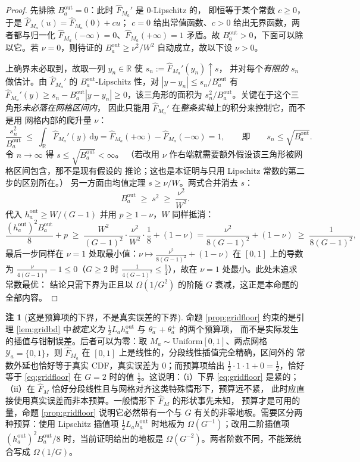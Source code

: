 \documentclass[a4paper,11pt]{article}
\theoremstyle{definition}
\newtheorem{remark}{注}
\newcommand{\R}{\mathbb R}
\newcommand{\1}{\mathbf 1}
\begin{document}
\begin{proof}
先排除 $B_a^{\mathrm{out}}=0$：此时 $\widehat F_{M_a}'$ 是 $0$-Lipschitz 的，
即恒等于某个常数 $c\ge0$，于是 $\widehat F_{M_a}(u)=\widehat F_{M_a}(0)+cu$；
$c=0$ 给出常值函数、$c>0$ 给出无界函数，两者都与归一化
$\widehat F_{M_a}(-\infty)=0$、$\widehat F_{M_a}(+\infty)=1$ 矛盾。故
$B_a^{\mathrm{out}}>0$，下面可以除以它。若 $\nu=0$，则待证的
$B_a^{\mathrm{out}}\ge\nu^2/W^2$ 自动成立，故以下设 $\nu>0$。

上确界未必取到，故取一列 $y_n\in\R$ 使 $s_n:=\widehat F_{M_a}'(y_n)\uparrow s$，
并对每个\emph{有限的} $s_n$ 做估计。由 $\widehat F_{M_a}'$ 的
$B_a^{\mathrm{out}}$-Lipschitz 性，对
$|y-y_n|\le s_n/B_a^{\mathrm{out}}$ 有
$\widehat F_{M_a}'(y)\ge s_n-B_a^{\mathrm{out}}|y-y_n|\ge 0$，该三角形的面积为
$s_n^2/B_a^{\mathrm{out}}$。关键在于这个三角形\emph{未必落在网格区间内}，
因此只能用 $\widehat F_{M_a}'$ 在\emph{整条实轴}上的积分来控制它，而不是用
网格内部的爬升量 $\nu$：
\[
\frac{s_n^2}{B_a^{\mathrm{out}}}
\;\le\;
\int_{\R}\widehat F_{M_a}'(y)\,\mathrm dy
=\widehat F_{M_a}(+\infty)-\widehat F_{M_a}(-\infty)
=1,
\qquad\text{即}\qquad
s_n\le\sqrt{B_a^{\mathrm{out}}} .
\]
令 $n\to\infty$ 得 $s\le\sqrt{B_a^{\mathrm{out}}}<\infty$。
（若改用 $\nu$ 作右端就需要额外假设该三角形被网格区间包含，那不是现有假设的
推论；这也是本证明与只用 Lipschitz 常数的第二步的区别所在。）
另一方面由均值定理 $s\ge\nu/W$。两式合并消去 $s$：
\[
B_a^{\mathrm{out}}\;\ge\;s^2\;\ge\;\frac{\nu^2}{W^2} .
\]
代入 $h_a^{\mathrm{out}}\ge W/(G-1)$ 并用 $p\ge1-\nu$，$W$ 同样抵消：
\[
\frac{(h_a^{\mathrm{out}})^2B_a^{\mathrm{out}}}{8}+p
\;\ge\;
\frac{W^2}{(G-1)^2}\cdot\frac{\nu^2}{W^2}\cdot\frac18+(1-\nu)
=\frac{\nu^2}{8(G-1)^2}+(1-\nu)
\;\ge\;
\frac{1}{8(G-1)^2},
\]
最后一步同样在 $\nu=1$ 处取最小值：$\nu\mapsto\frac{\nu^2}{8(G-1)^2}
+(1-\nu)$ 在 $[0,1]$ 上的导数为 $\frac{\nu}{4(G-1)^2}-1\le0$（$G\ge2$ 时
$\frac{1}{4(G-1)^2}\le\frac14$），故在 $\nu=1$ 处最小。此处未追求常数最优：
结论只需下界为正且以 $\Omega(1/G^2)$ 的阶随 $G$ 衰减，这正是本命题的
全部内容。
\end{proof}

\begin{remark}[这是预算项的下界，不是真实误差的下界]
\label{rem:gridfloorscope}
命题 \ref{prop:gridfloor} 约束的是引理 \ref{lem:gridbd} 中\emph{被定义为}
$\tfrac12L_ah_a^{\mathrm{out}}$ 与 $\theta_a^-+\theta_a^+$ 的两个预算项，
而不是实际发生的插值与钳制误差。后者可以为零：取 $M_a\sim
\mathrm{Uniform}[0,1]$、两点网格 $\mathcal Y_a=\{0,1\}$，则
$\widehat F_{M_a}$ 在 $[0,1]$ 上是线性的，分段线性插值完全精确，区间外的
常数外延也恰好等于真实 CDF，真实误差为 $0$；而预算项给出
$\tfrac12\cdot1\cdot1+0=\tfrac12$，恰好等于 \eqref{eq:gridfloor} 在 $G=2$
时的值 $\tfrac12$。这说明：（i）下界 \eqref{eq:gridfloor} 是紧的；
（ii）在 $\widehat F_M$ 恰好分段线性且与网格对齐这类特殊情形下，预算远不紧，
此时应直接使用真实误差而非本预算。一般情形下 $\widehat F_M$ 的形状事先未知，
预算才是可用的量，命题 \ref{prop:gridfloor} 说明它必然带有一个与 $G$
有关的非零地板。需要区分两种预算：使用 Lipschitz 插值项
$\tfrac12L_ah_a^{\mathrm{out}}$ 时地板为 $\Omega(G^{-1})$；改用二阶插值项
$(h_a^{\mathrm{out}})^2B_a^{\mathrm{out}}/8$ 时，当前证明给出的地板是
$\Omega(G^{-2})$。两者阶数不同，不能笼统合写成 $\Omega(1/G)$。
\end{remark}
\end{document}
